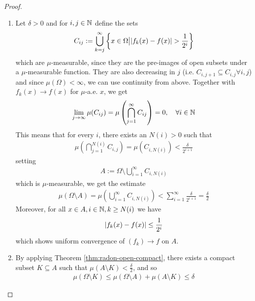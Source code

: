 \begin{proof}
  \begin{enumerate}
    \item 
      Let $\delta > 0$ and for $i,j \in \mathbb{N}$ define the sets
      \begin{align*}
        C_{ij} := \bigcup_{k=j}^{\infty} \left\{x \in \Omega \big\vert \vert f_k(x) - f(x)\vert > \frac{1}{2^{i}}\right\}
      \end{align*}
      which are $\mu$-measurable, since they are the pre-images of open subsets under a $\mu$-measurable function.
      They are also decreasing in $j$ (i.e. $C_{i,j + 1} \subseteq C_{i,j} \forall i,j$) and since $\mu(\Omega) < \infty$,
      we can use continuity from above. 
      Together with $f_k(x) \to f(x)$ for $\mu$-a.e. $x$, we get
      \begin{align*}
        \lim_{j \to \infty} \mu(C_{ij}) = \mu\left(
          \bigcap_{j=1}^{\infty}C_{ij}
        \right)
        = 0, \quad \forall i \in \mathbb{N}
      \end{align*}
      This means that for every $i$, there exists an $N(i) > 0$ such that
      \begin{align*}
        \mu\left(
          \bigcap_{j=1}^{N(i)}C_{i,j}
        \right)
        =
        \mu(C_{i,N(i)})  < \frac{\delta}{2^{i+1}}
      \end{align*}
      setting
      \begin{align*}
        A := \Omega \setminus \bigcup_{i=1}^{\infty}C_{i,N(i)}
      \end{align*}
      which is $\mu$-measurable, we get the estimate
      \begin{align*}
        \mu(\Omega \setminus A) = \mu \left(
          \bigcup_{i=1}^{\infty}C_{i,N(i)} 
        \right)
        < \sum_{i=1}^{\infty} \frac{\delta}{2^{i+1}} = \frac{\delta}{2}
      \end{align*}
      Moreover, for all $x \in A, i \in \mathbb{N}, k \geq N(i)$ we have
      \begin{align*}
        \vert f_k(x) - f(x)\vert \leq \frac{1}{2^{i}}
      \end{align*}
      which shows uniform convergence of $(f_k) \to f$ on $A$.
    \item 
      By applying Theorem \ref{thm:radon-open-compact}, there exists a compact subset $K \subseteq A$ such that $\mu(A \setminus K) < \frac{\delta}{2}$, and so
      \begin{align*}
        \mu(\Omega \setminus K) \leq \mu(\Omega \setminus A) + \mu(A \setminus K) \leq \delta
      \end{align*}
  \end{enumerate}
\end{proof}

